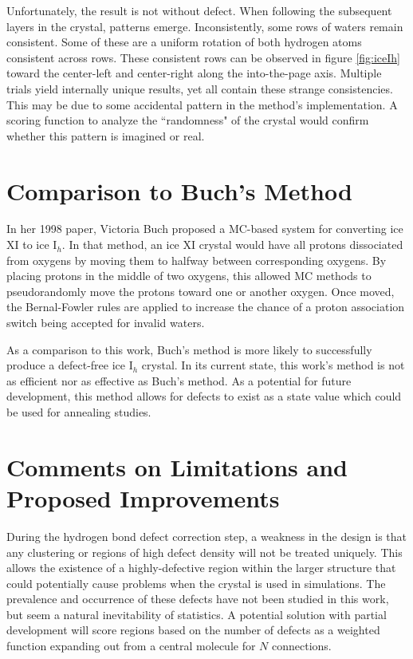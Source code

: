 Unfortunately, the result is not without defect.
When following the subsequent layers in the crystal, patterns emerge. 
Inconsistently, some rows of waters remain consistent.
Some of these are a uniform rotation of both hydrogen atoms consistent across rows.
These consistent rows can be observed in figure \ref{fig:iceIh} toward the center-left and center-right along the into-the-page axis.
Multiple trials yield internally unique results, yet all contain these strange consistencies.
This may be due to some accidental pattern in the method's implementation.
A scoring function to analyze the ``randomness" of the crystal would confirm whether this pattern is imagined or real.

%
%
%
%
\section{Comparison to Buch's Method}

In her 1998 paper, Victoria Buch proposed a MC-based system for converting ice XI to ice I$_{h}$.\cite{MCIce} 
In that method, an ice XI crystal would have all protons dissociated from oxygens by moving them to halfway between corresponding oxygens.
By placing protons in the middle of two oxygens, this allowed MC methods to pseudorandomly move the protons toward one or another oxygen.
Once moved, the Bernal-Fowler rules are applied to increase the chance of a proton association switch being accepted for invalid waters.

As a comparison to this work, Buch's method is more likely to successfully produce a defect-free ice I$_{h}$ crystal.
In its current state, this work's method is not as efficient nor as effective as Buch's method.
As a potential for future development, this method allows for defects to exist as a state value which could be used for annealing studies.



\section{Comments on Limitations and Proposed Improvements}

During the hydrogen bond defect correction step, a weakness in the design is that any clustering or regions of high defect density will not be treated uniquely.
This allows the existence of a highly-defective region within the larger structure that could potentially cause problems when the crystal is used in simulations. 
The prevalence and occurrence of these defects have not been studied in this work, but seem a natural inevitability of statistics. 
A potential solution with partial development will score regions based on the number of defects as a weighted function expanding out from a central molecule for $N$ connections. 


